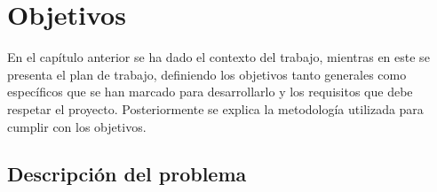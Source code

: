 \chapter{Objetivos}
\label{cap:capitulo2}



\vspace{1cm}

En el capítulo anterior se ha dado el contexto del trabajo, mientras en este se presenta el plan de trabajo, definiendo los objetivos tanto generales como específicos que se han marcado para desarrollarlo y los requisitos que debe respetar el proyecto. Posteriormente se explica la metodología utilizada para cumplir con los objetivos.\\

\section{Descripción del problema}
\label{sec:descripcion}

